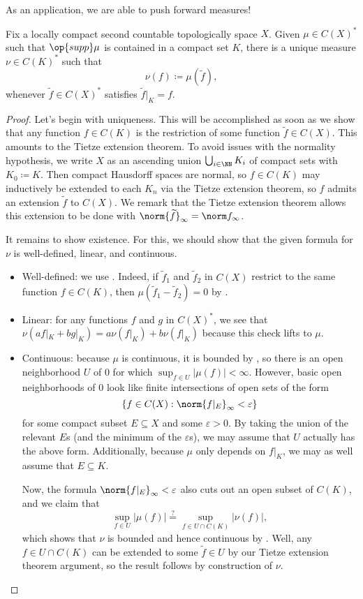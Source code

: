 \documentclass[../notes.tex]{subfiles}
\begin{document}
As an application, we are able to push forward measures!
\begin{lemma} \label{lem:pullback-compact}
	Fix a locally compact second countable topologically space $X$. Given $\mu\in C(X)^*$ such that $\op{supp}\mu$ is contained in a compact set $K$, there is a unique measure $\nu\in C(K)^*$ such that
	\[\nu(f)\coloneqq\mu(\widetilde f),\]
	whenever $\widetilde f\in C(X)^*$ satisfies $\widetilde f|_K=f$.
\end{lemma}
\begin{proof}
	Let's begin with uniqueness. This will be accomplished as soon as we show that any function $f\in C(K)$ is the restriction of some function $\widetilde f\in C(X)$. This amounts to the Tietze extension theorem. To avoid issues with the normality hypothesis, we write $X$ as an ascending union $\bigcup_{i\in\NN}K_i$ of compact sets with $K_0\coloneqq K$. Then compact Hausdorff spaces are normal, so $f\in C(K)$ may inductively be extended to each $K_n$ via the Tietze extension theorem, so $f$ admits an extension $\widetilde f$ to $C(X)$. We remark that the Tietze extension theorem allows this extension to be done with $\norm{\widetilde f}_\infty=\norm f_\infty$.

	It remains to show existence. For this, we should show that the given formula for $\nu$ is well-defined, linear, and continuous.
	\begin{itemize}
		\item Well-defined: we use . Indeed, if $\widetilde f_1$ and $\widetilde f_2$ in $C(X)$ restrict to the same function $f\in C(K)$, then $\mu(\widetilde f_1-\widetilde f_2)=0$ by .
		\item Linear: for any functions $f$ and $g$ in $C(X)^*$, we see that $\nu(af|_K+bg|_K)=a\nu(f|_K)+b\nu(f|_K)$ because this check lifts to $\mu$.
		\item Continuous: because $\mu$ is continuous, it is bounded by , so there is an open neighborhood $U$ of $0$ for which $\sup_{f\in U}\left|\mu(f)\right|<\infty$. However, basic open neighborhoods of $0$ look like finite intersections of open sets of the form
		\[\{f\in C(X):\norm {f|_E}_\infty<\varepsilon\}\]
		for some compact subset $E\subseteq X$ and some $\varepsilon>0$. By taking the union of the relevant $E$s (and the minimum of the $\varepsilon$s), we may assume that $U$ actually has the above form. Additionally, because $\mu$ only depends on $f|_K$, we may as well assume that $E\subseteq K$.
		
		Now, the formula $\norm {f|_E}_\infty<\varepsilon$ also cuts out an open subset of $C(K)$, and we claim that
		\[\sup_{f\in U}\left|\mu(f)\right|\stackrel?=\sup_{f\in U\cap C(K)}\left|\nu(f)\right|,\]
		which shows that $\nu$ is bounded and hence continuous by . Well, any $f\in U\cap C(K)$ can be extended to some $\widetilde f\in U$ by our Tietze extension theorem argument, so the result follows by construction of $\nu$.
		\qedhere
	\end{itemize}
\end{proof}
\end{document}
